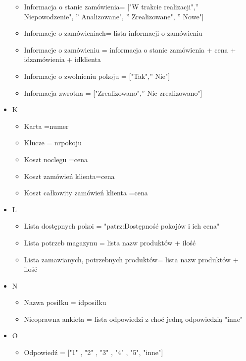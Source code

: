 \documentclass[a4paper, 11pt]{article}
\begin{document}
\begin{itemize}
\begin{itemize}
			\item Informacja o stanie zamówienia= ["W trakcie realizacji",'' Niepowodzenie", '' Analizowane", '' Zrealizowane", '' Nowe"]
			\item Informacje o zamówieniach= lista informacji o zamówieniu
			\item Informacje o zamówieniu = informacja o stanie zamówienia + cena + idzamówienia + idklienta
			\item Informacje o zwolnieniu pokoju = ["Tak",'' Nie"]
			\item Informacja zwrotna = ["Zrealizowano",'' Nie zrealizowano"]
		\end{itemize}
		\item K
		\begin{itemize}
			\item Karta =numer
			\item Klucze = nrpokoju
			\item Koszt noclegu =cena
			\item Koszt zamówień klienta=cena
			\item Koszt całkowity zamówień klienta =cena
		\end{itemize}
		\item L
		\begin{itemize}
			\item Lista dostępnych pokoi = "patrz:Dostępność pokojów i ich cena"
			\item Lista potrzeb magazynu = lista nazw produktów + ilość
			\item Lista zamawianych, potrzebnych produktów= lista nazw produktów + ilość
		\end{itemize}
		\item N
		\begin{itemize}
			\item Nazwa posiłku = idposiłku
			\item Nieoprawna ankieta = lista odpowiedzi z choć jedną odpowiedzią "inne"
		\end{itemize}
		\item O
		\begin{itemize}
			\item Odpowiedź =  	["1" , "2" , "3" , "4" , "5", "inne"] 
		\end{itemize}
		

\end{itemize}
\end{document}
